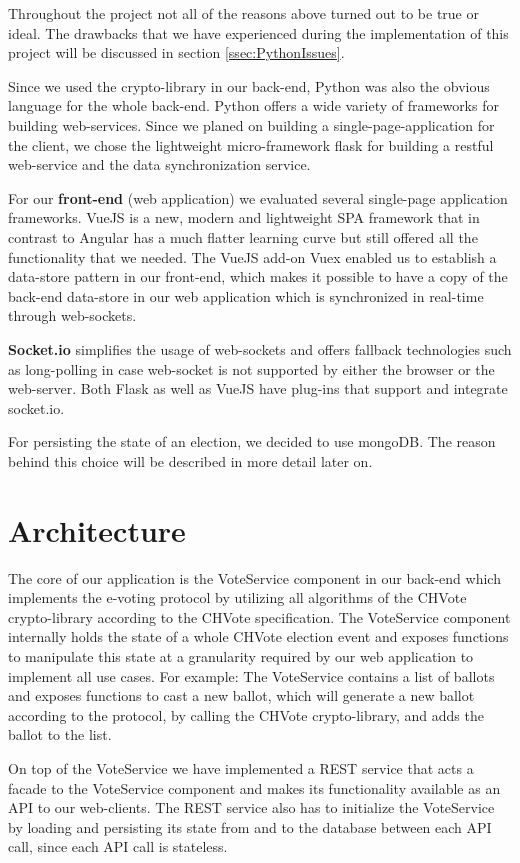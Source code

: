 Throughout the project not all of the reasons above turned out to be true or ideal. The drawbacks that we have experienced during the implementation of this project will be discussed in section \ref{ssec:PythonIssues}.

Since we used the crypto-library in our back-end, Python was also the obvious language for the whole back-end. Python offers a wide variety of frameworks for building web-services. Since we planed on building a single-page-application for the client, we chose the lightweight micro-framework flask for building a restful web-service and the data synchronization service.

For our \textbf{front-end} (web application) we evaluated several single-page application frameworks. VueJS is a new, modern and lightweight SPA framework that in contrast to Angular has a much flatter learning curve but still offered all the functionality that we needed. The VueJS add-on Vuex enabled us to establish a data-store pattern in our front-end, which makes it possible to have a copy of the back-end data-store in our web application which is synchronized in real-time through web-sockets.

\textbf{Socket.io} simplifies the usage of web-sockets and offers fallback technologies such as long-polling in case web-socket is not supported by either the browser or the web-server. Both Flask as well as VueJS have plug-ins that support and integrate socket.io.

For persisting the state of an election, we decided to use mongoDB. The reason behind this choice will be described in more detail later on.

\section{Architecture}
The core of our application is the VoteService component in our back-end which implements the e-voting protocol by utilizing all algorithms of the CHVote crypto-library according to the CHVote specification. The VoteService component internally holds the state of a whole CHVote election event and exposes functions to manipulate this state at a granularity required by our web application to implement all use cases. For example: The VoteService contains a list of ballots and exposes functions to cast a new ballot, which will generate a new ballot according to the protocol, by calling the CHVote crypto-library, and adds the ballot to the list.

On top of the VoteService we have implemented a REST service that acts a facade to the VoteService component and makes its functionality available as an API to our web-clients. The REST service also has to initialize the VoteService by loading and persisting its state from and to the database between each API call, since each API call is stateless.

